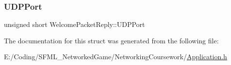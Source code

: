 \subsubsection{\texorpdfstring{U\+D\+P\+Port}{UDPPort}}
{\footnotesize\ttfamily unsigned short Welcome\+Packet\+Reply\+::\+U\+D\+P\+Port}



The documentation for this struct was generated from the following file\+:\begin{DoxyCompactItemize}
\item 
E\+:/\+Coding/\+S\+F\+M\+L\+\_\+\+Networked\+Game/\+Networking\+Coursework/\hyperlink{_application_8h}{Application.\+h}\end{DoxyCompactItemize}
